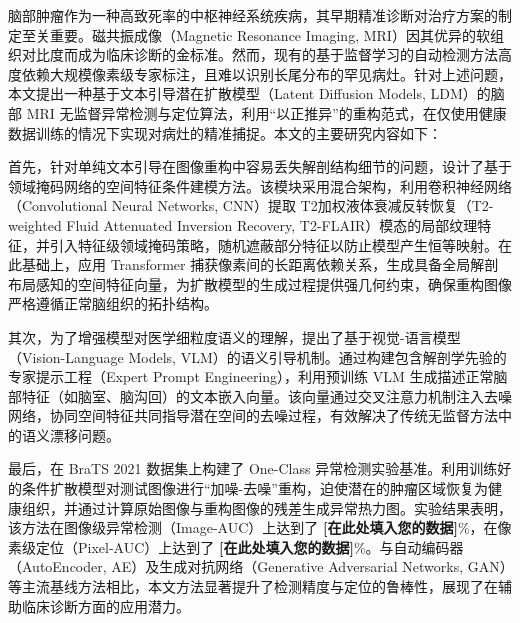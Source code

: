 \documentclass[Win]{xjtuBSThesis}  %
\begin{document}
\begin{abstractcn} %

脑部肿瘤作为一种高致死率的中枢神经系统疾病，其早期精准诊断对治疗方案的制定至关重要。磁共振成像（Magnetic Resonance Imaging, MRI）因其优异的软组织对比度而成为临床诊断的金标准。然而，现有的基于监督学习的自动检测方法高度依赖大规模像素级专家标注，且难以识别长尾分布的罕见病灶。针对上述问题，本文提出一种基于文本引导潜在扩散模型（Latent Diffusion Models, LDM）的脑部 MRI 无监督异常检测与定位算法，利用“以正推异”的重构范式，在仅使用健康数据训练的情况下实现对病灶的精准捕捉。本文的主要研究内容如下：

首先，针对单纯文本引导在图像重构中容易丢失解剖结构细节的问题，设计了基于领域掩码网络的空间特征条件建模方法。该模块采用混合架构，利用卷积神经网络（Convolutional Neural Networks, CNN）提取 T2加权液体衰减反转恢复（T2-weighted Fluid Attenuated Inversion Recovery, T2-FLAIR）模态的局部纹理特征，并引入特征级领域掩码策略，随机遮蔽部分特征以防止模型产生恒等映射。在此基础上，应用 Transformer 捕获像素间的长距离依赖关系，生成具备全局解剖布局感知的空间特征向量，为扩散模型的生成过程提供强几何约束，确保重构图像严格遵循正常脑组织的拓扑结构。

其次，为了增强模型对医学细粒度语义的理解，提出了基于视觉-语言模型（Vision-Language Models, VLM）的语义引导机制。通过构建包含解剖学先验的专家提示工程（Expert Prompt Engineering），利用预训练 VLM 生成描述正常脑部特征（如脑室、脑沟回）的文本嵌入向量。该向量通过交叉注意力机制注入去噪网络，协同空间特征共同指导潜在空间的去噪过程，有效解决了传统无监督方法中的语义漂移问题。

最后，在 BraTS 2021 数据集上构建了 One-Class 异常检测实验基准。利用训练好的条件扩散模型对测试图像进行“加噪-去噪”重构，迫使潜在的肿瘤区域恢复为健康组织，并通过计算原始图像与重构图像的残差生成异常热力图。实验结果表明，该方法在图像级异常检测（Image-AUC）上达到了 \textbf{[在此处填入您的数据]}\%，在像素级定位（Pixel-AUC）上达到了 \textbf{[在此处填入您的数据]}\%。与自动编码器（AutoEncoder, AE）及生成对抗网络（Generative Adversarial Networks, GAN）等主流基线方法相比，本文方法显著提升了检测精度与定位的鲁棒性，展现了在辅助临床诊断方面的应用潜力。

\end{abstractcn}

\end{document}
